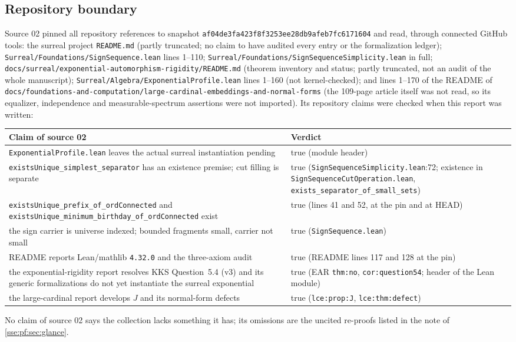 \documentclass[11pt,a4paper]{article}
\numberwithin{equation}{section}
\theoremstyle{plain}
\theoremstyle{definition}
\theoremstyle{remark}
\newcommand{\code}[1]{\texttt{\small #1}}
\newcommand{\lbl}[1]{\nolinkurl{#1}}%
\newcommand{\fn}[1]{\nolinkurl{#1}}%
\begin{document}
\subsection{Repository boundary}
Source 02 pinned all repository references to snapshot
\code{af04de3fa423f8f3253ee28db9afeb7fc6171604} and read, through connected
GitHub tools: the surreal project \fn{README.md} (partly truncated; no
claim to have audited every entry or the formalization ledger);
\fn{Surreal/Foundations/SignSequence.lean} lines 1--110;
\fn{Surreal/Foundations/SignSequenceSimplicity.lean} in full;
\fn{docs/surreal/exponential-automorphism-rigidity/README.md} (theorem
inventory and status; partly truncated, not an audit of the whole
manuscript); \fn{Surreal/Algebra/ExponentialProfile.lean} lines 1--160
(not kernel-checked); and lines 1--170 of the README of
\fn{docs/foundations-and-computation/large-cardinal-embeddings-and-normal-forms}
(the 109-page article itself was not read, so its equalizer, independence
and measurable-spectrum assertions were not imported). Its repository
claims were checked when this report was written:

\begin{longtable}{P{80mm}P{68mm}}
\toprule
Claim of source 02 & Verdict \\
\midrule
\endhead
\code{ExponentialProfile.lean} leaves the actual surreal instantiation pending & true (module header) \\
\code{existsUnique\_simplest\_separator} has an existence premise; cut filling is separate & true (\fn{SignSequenceSimplicity.lean}:72; existence in \fn{SignSequenceCutOperation.lean}, \code{exists\_separator\_of\_small\_sets}) \\
\fn{existsUnique_prefix_of_ordConnected} and \fn{existsUnique_minimum_birthday_of_ordConnected} exist & true (lines 41 and 52, at the pin and at HEAD) \\
the sign carrier is universe indexed; bounded fragments small, carrier not small & true (\fn{SignSequence.lean}) \\
README reports Lean/mathlib \code{4.32.0} and the three-axiom audit & true (README lines 117 and 128 at the pin) \\
the exponential-rigidity report resolves KKS Question~5.4 (v3) and its generic formalizations do not yet instantiate the surreal exponential & true (EAR \lbl{thm:no}, \lbl{cor:question54}; header of the Lean module) \\
the large-cardinal report develops $J$ and its normal-form defects & true (\lbl{lce:prop:J}, \lbl{lce:thm:defect}) \\
\bottomrule
\end{longtable}
No claim of source 02 says the collection lacks something it has; its
omissions are the uncited re-proofs listed in the note of
\cref{sse:pf:sec:glance}.
\end{document}

